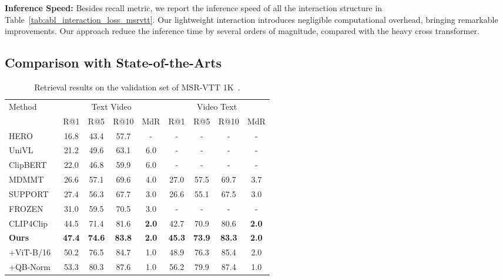\documentclass[runningheads]{llncs}
\begin{document}
\noindent\textbf{Inference Speed:}  Besides recall metric, we report the inference speed of all the interaction structure in Table~\ref{tab:abl_interaction_loss_msrvtt}.  Our lightweight interaction introduces negligible computational overhead, bringing remarkable improvements. Our approach reduce the inference time by several orders of magnitude, compared with the heavy cross transformer.

\subsection{Comparison with State-of-the-Arts }
\label{sec:sota}
\begin{table}[tbp]
\centering
\caption{Retrieval results on the validation set of MSR-VTT 1K~\cite{msrvtt}.
}
\vspace*{-2mm}
\small
\setlength{\tabcolsep}{2.pt}
\begin{tabular}{lcccccccc}
\toprule
 \multirow{2}{*}{Method} & \multicolumn{4}{c}{Text Video}& \multicolumn{4}{c}{Video Text}\\
 \cmidrule(r){2-5}
 \cmidrule(r){6-9}
 & R@1 & R@5& R@10 & MdR &  R@1 & R@5 & R@10 & MdR \\
\hline
HERO~\cite{hero} &   16.8& 43.4& 57.7& - &- &- &-& - \\
UniVL~\cite{univl} &  21.2&49.6 &63.1& 6.0& - &- &- &- \\
ClipBERT~\cite{clipbert}&  22.0 &46.8 &59.9& 6.0& - &- &- &- \\
MDMMT~\cite{mmt} &   26.6& 57.1& 69.6& 4.0& 27.0& 57.5& 69.7 &3.7 \\
SUPPORT~\cite{support} &27.4& 56.3& 67.7 &3.0 &26.6 &55.1& 67.5 &3.0 \\
FROZEN~\cite{frozen}&  31.0& 59.5& 70.5& 3.0&  -&  - & -& -  \\
CLIP4Clip~\cite{clip4clip}&  44.5 &71.4& 81.6& \textbf{2.0} & 42.7& 70.9& 80.6& \textbf{2.0} \\
\hline
\rowcolor{Gray}
\textbf{Ours} & \textbf{47.4}  & \textbf{74.6}&  \textbf{83.8} & \textbf{2.0} & \textbf{45.3} & \textbf{73.9} & \textbf{83.3} & \textbf{2.0} \\
\rowcolor{Gray}
+ViT-B/16 & 50.2 & 76.5  & 84.7 &  1.0  & 48.9  & 76.3 & 85.4 & 2.0\\
\rowcolor{Gray}
+QB-Norm~\cite{qbnorm} &  53.3 & 80.3&  87.6& 1.0 & 56.2 & 79.9  & 87.4 & 1.0  \\
\bottomrule
\end{tabular}
\label{tab:sota_msrvtt}
\end{table}
\end{document}
